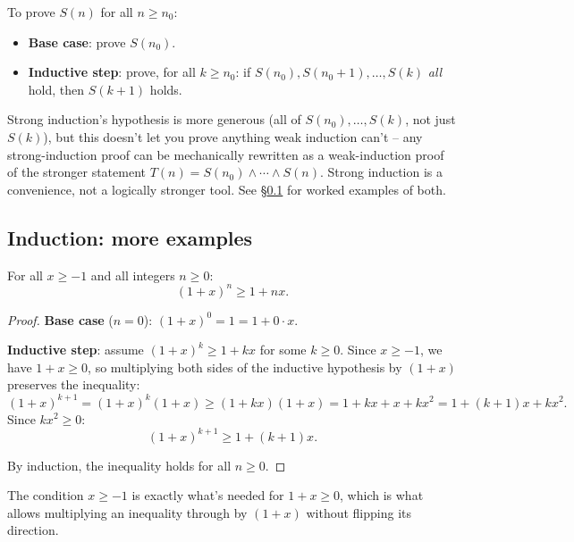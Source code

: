\bigskip
\begin{definition}
To prove $S(n)$ for all $n\ge n_0$:
\begin{itemize}
    \item \textbf{Base case}: prove $S(n_0)$.
    \item \textbf{Inductive step}: prove, for all $k\ge n_0$: if $S(n_0),S(n_0+1),\dots,S(k)$ \emph{all} hold, then $S(k+1)$ holds.
\end{itemize}
\end{definition}

\begin{note}
Strong induction's hypothesis is more generous (all of $S(n_0),\dots,S(k)$, not just $S(k)$), but this doesn't let you prove anything weak induction can't -- any strong-induction proof can be mechanically rewritten as a weak-induction proof of the stronger statement $T(n) = S(n_0)\wedge\cdots\wedge S(n)$. Strong induction is a convenience, not a logically stronger tool. See \S\ref{sec:3-11} for worked examples of both.
\end{note}

\subsection{Induction: more examples}
\label{sec:3-11}

\bigskip
\begin{example}
For all $x \ge -1$ and all integers $n \ge 0$:
\[
(1+x)^n \ge 1 + nx.
\]
\end{example}
\begin{proof}
\textbf{Base case} ($n=0$): $(1+x)^0 = 1 = 1+0\cdot x$.

\textbf{Inductive step}: assume $(1+x)^k \ge 1+kx$ for some $k \ge 0$. Since $x \ge -1$, we have $1+x \ge 0$, so multiplying both sides of the inductive hypothesis by $(1+x)$ preserves the inequality:
\[
(1+x)^{k+1} = (1+x)^k(1+x) \ge (1+kx)(1+x) = 1 + kx + x + kx^2 = 1 + (k+1)x + kx^2.
\]
Since $kx^2 \ge 0$:
\[
(1+x)^{k+1} \ge 1 + (k+1)x.
\]

By induction, the inequality holds for all $n \ge 0$.
\end{proof}

\begin{note}
The condition $x\ge-1$ is exactly what's needed for $1+x\ge0$, which is what allows multiplying an inequality through by $(1+x)$ without flipping its direction.
\end{note}

